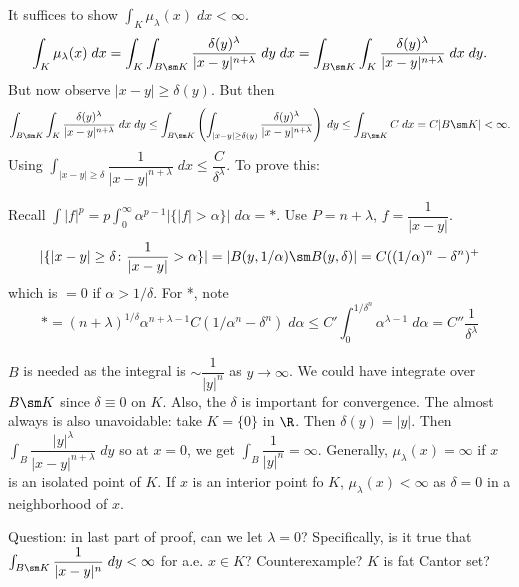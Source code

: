 \pf It suffices to show $\int_K \mu_\lambda(x) \; dx < \infty$.
	\[
	\int_K \mu_\lambda(x) \; dx = \int_K \int_{B \sm K} \dfrac{\delta(y)^\lambda}{|x-y|^{n+\lambda}} \; dy \; dx = \int_{B \sm K} \int_K \dfrac{\delta(y)^\lambda}{|x-y|^{n+\lambda}} \; dx \; dy.
	\]
But now observe $|x-y| \geq \delta(y)$. But then 
	\[
	\int_{B \sm K} \int_K \dfrac{\delta(y)^\lambda}{|x-y|^{n+\lambda}} \; dx \; dy \leq \int_{B \sm K} \left( \int_{|x-y| \geq \delta(y)} \dfrac{\delta(y)^\lambda}{|x-y|^{n+\lambda}} \right) \; dy \leq \int_{B \sm K} C \; dx = C |B \sm K|< \infty.
	\]
Using $\int_{|x-y| \geq \delta} \dfrac{1}{|x-y|^{n+\lambda}} \; dx \leq \dfrac{C}{\delta^\lambda}$. To prove this:

Recall $\int |f|^p= p \int_0^\infty \alpha^{p-1} |\{|f|>\alpha\}| \; d \alpha= *$. Use $P= n + \lambda$, $f=\dfrac{1}{|x-y|}$.
	\[
	| \{ |x-y| \geq \delta \colon \dfrac{1}{|x-y|}>\alpha\}| = |B(y,1/\alpha) \sm B(y,\delta)|= C((1/\alpha)^n - \delta^n)^+
	\]
which is $=0$ if $\alpha>1/\delta$. For *, note
	\[
	*= (n+\lambda)^{1/\delta} \alpha^{n+\lambda-1} C (1/\alpha^n - \delta^n) \; d\alpha \leq C' \int_0^{1/\delta^n} \alpha^{\lambda-1} \; d \alpha = C'' \dfrac{1}{\delta^\lambda}
	\]





$B$ is needed as the integral is $\sim \dfrac{1}{|y|^n}$ as $y \to \infty$. We could have integrate over $B \sm K$ since $\delta \equiv 0$ on $K$. Also, the $\delta$ is important for convergence. The almost always is also unavoidable: take $K=\{0\}$ in $\R$. Then $\delta(y)= |y|$. Then $\int_B \dfrac{|y|^\lambda}{|x-y|^{n+\lambda}} \; dy$ so at $x=0$, we get $\int_B \dfrac{1}{|y|^n}= \infty$. Generally, $\mu_\lambda(x)= \infty$ if $x$ is an isolated point of $K$. If $x$ is an interior point fo $K$, $\mu_\lambda(x)< \infty$ as $\delta=0$ in a neighborhood of $x$.




Question: in last part of proof, can we let $\lambda=0$? Specifically, is it true that $\int_{B \sm K} \dfrac{1}{|x-y|^n} \; dy< \infty$ for a.e. $x \in K$? Counterexample? $K$ is fat Cantor set?




















